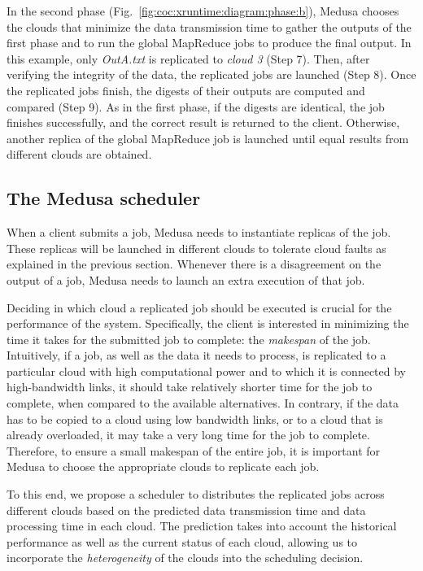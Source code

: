 \documentclass[10pt, conference, compsocconf]{IEEEtran}
\begin{document}
In the second phase (Fig.~\ref{fig:coc:xruntime:diagram:phase:b}), Medusa chooses the  clouds that minimize the data transmission time to gather the outputs of the first phase and to run the global MapReduce jobs to produce the final output.
In this example, only \emph{OutA.txt} is replicated to \emph{cloud 3} (Step 7).
Then, after verifying the integrity of the data, the  replicated jobs are launched (Step 8).
Once the  replicated jobs finish, the digests of their outputs are computed and compared (Step 9).
As in the first phase, if the digests are identical, the job finishes successfully, and the correct result is returned to the client.
Otherwise, another replica of the global MapReduce job is launched until  equal results from different clouds are obtained.

\subsection{The Medusa scheduler}
\label{subsec:solution:scheduler}

When a client submits a job, Medusa needs to instantiate  replicas of the job.
These replicas will be launched in different clouds to tolerate cloud faults as explained in the previous section.
Whenever there is a disagreement on the output of a job, Medusa needs to launch an extra execution of that job.

Deciding in which cloud a replicated job should be executed is crucial for the performance of the system. Specifically, the client is interested in minimizing the time it takes for the submitted job to complete: the \emph{makespan} of the job. Intuitively, if a job, as well as the data it needs to process, is replicated to a particular cloud with high computational power and to which it is connected by high-bandwidth links, it should take relatively shorter time for the job to complete, when compared to the available alternatives. In contrary, if the data has to be copied to a cloud using low bandwidth links, or to a cloud that is already overloaded, it may take a very long time for the job to complete. Therefore, to ensure a small makespan of the entire job, it is important for Medusa to choose the appropriate clouds to replicate each job.

To this end, we propose a scheduler to distributes the replicated jobs across different clouds based on the predicted data transmission time and data processing time in each cloud. The prediction takes into account the historical performance as well as the current status of each cloud, allowing us to incorporate the \emph{heterogeneity} of the clouds into the scheduling decision.
\end{document}
